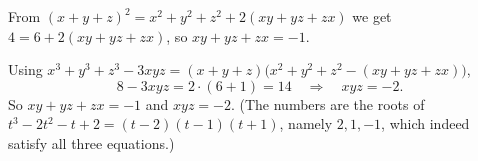 From $(x+y+z)^2=x^2+y^2+z^2+2(xy+yz+zx)$ we get $4=6+2(xy+yz+zx)$, so $xy+yz+zx=-1$.

Using $x^3+y^3+z^3-3xyz=(x+y+z)\bigl(x^2+y^2+z^2-(xy+yz+zx)\bigr)$,
\[
8-3xyz=2\cdot(6+1)=14\quad\Longrightarrow\quad xyz=-2 .
\]
So $\boxed{xy+yz+zx=-1}$ and $\boxed{xyz=-2}$. (The numbers are the roots of $t^3-2t^2-t+2=(t-2)(t-1)(t+1)$, namely $2,1,-1$, which indeed satisfy all three equations.)
